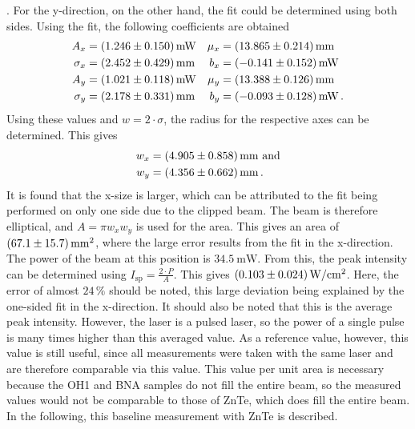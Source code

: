 .
For the y-direction, on the other hand, the fit could be determined using both sides.
Using the fit, the following coefficients are obtained
\begin{align}
    A_x &= \SI{1.246+-0.150}{mW} & \mu_x &= \SI{13.865+-0.214}{mm} \\
    \sigma_x &= \SI{2.452+-0.429}{mm} & b_x &= \SI{-0.141+-0.152}{mW} \\
    A_y &= \SI{1.021+-0.118}{mW} & \mu_y &= \SI{13.388+-0.126}{mm} \\
    \sigma_y &= \SI{2.178+-0.331}{mm} & b_y &= \SI{-0.093+-0.128}{mW} \,.
\end{align}
Using these values and $w=2\cdot\sigma $, the radius for the respective axes can be
determined.
This gives
\begin{align}
	w_x &= \SI{4.905+-0.858}{\milli\meter} \ \text{and}\\
	w_y &= \SI{4.356+-0.662}{\milli\meter} \, .
\end{align}
It is found that the x-size is larger, which can be attributed to the fit being performed on
only one side due to the clipped beam.
The beam is therefore elliptical, and $A = \pi w_x w_y$ is used for the area.
This gives an area of $\SI{67.1+-15.7}{\milli\meter\squared}$, where the large error results
from the fit in the x-direction.
The power of the beam at this position is $\SI{34.5}{\milli\watt}$.
From this, the peak intensity can be determined using $I_\text{sp}= \frac{2\cdot P}{A}$.
This gives $\SI{0.103+-0.024}{\watt\per\centi\meter\squared}$.
Here, the error of almost $24\,\%$ should be noted, this large deviation being explained by
the one-sided fit in the x-direction.
It should also be noted that this is the average peak intensity.
However, the laser is a pulsed laser, so the power of a single pulse is many times higher
than this averaged value.
As a reference value, however, this value is still useful, since all measurements were
taken with the same laser and are therefore comparable via this value.
This value per unit area is necessary because the OH1 and BNA samples do not fill the
entire beam, so the measured values would not be comparable to those of ZnTe, which does
fill the entire beam.
In the following, this baseline measurement with ZnTe is described.

